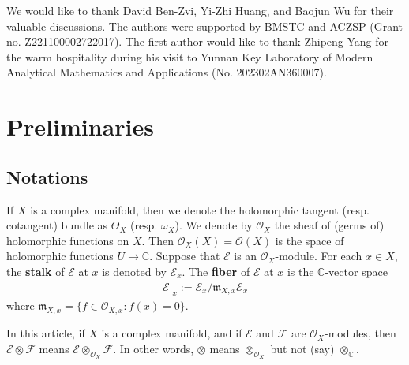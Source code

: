\documentclass[11pt,b5paper,notitlepage]{article}
\theoremstyle{definition}
\theoremstyle{plain}
\newcommand{\mc}{\mathcal}
\newcommand{\scr}{\mathscr}
\newcommand{\Cbb}{\mathbb C}
\newcommand{\<}{\left\langle}
\renewcommand{\>}{\right\rangle}
\newcommand{\mk}{\mathfrak m}
\numberwithin{equation}{subsection}
\begin{document}
We would like to thank David Ben-Zvi, Yi-Zhi Huang, and Baojun Wu for their valuable discussions. The authors were supported by BMSTC and ACZSP (Grant no. Z221100002722017). The first author would like to thank Zhipeng Yang for the warm hospitality during his visit to Yunnan Key Laboratory of Modern Analytical Mathematics and Applications (No. 202302AN360007).







































\section{Preliminaries}

\subsection{Notations}

If $X$ is a complex manifold, then we denote the holomorphic tangent (resp. cotangent) bundle as $\Theta_X$ (resp. $\omega_X$). We denote by $\mc O_X$ the sheaf of (germs of) holomorphic functions on $X$. Then $\mc O_X(X)=\mc O(X)$ is the space of holomorphic functions $U\rightarrow\Cbb$. Suppose that $\scr E$ is an $\mc O_X$-module. For each $x\in X$, the \textbf{stalk} of $\scr E$ at $x$ is denoted by $\scr E_x$. The \textbf{fiber} of $\scr E$ at $x$ is the $\Cbb$-vector space
\begin{align}
\scr E|_x:=\scr E_x/\mk_{X,x}\scr E_x
\end{align}  
where $\mk_{X,x}=\{f\in\mc O_{X,x}:f(x)=0\}$. 


In this article, if $X$ is a complex manifold, and if $\scr E$ and $\scr F$ are $\mc O_X$-modules, then $\scr E\otimes\scr F$ means $\scr E\otimes_{\mc O_X}\scr F$. In other words, $\otimes$ means $\otimes_{\mc O_X}$ but not (say) $\otimes_\Cbb$.
\end{document}

